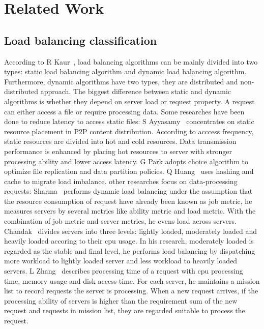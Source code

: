 \section{Related Work}
\label{sec:related_work}

\subsection{Load balancing classification}

\hspace{0pt}
According to R Kaur~{\cite{Kaur2014Load}}, load balancing algorithms can be mainly divided into two types: static load balancing algorithm and dynamic load balancing algorithm. Furthermore, dynamic algorithms have two types,
they are distributed and non-distributed approach. The biggest difference between static and dynamic algorithms is whether they depend on server load or request property. A request can either access a file or require processing data. Some researches have been done to reduce latency to access static files:
S Ayyasamy~{\cite{Ayyasamy2010A}} concentrates on static resource placement in P2P content distribution. According to acccess frequency, static resources are divided into hot and cold resources. Data transmission performance is enhanced by placing hot resources to server with
stronger processing ability and lower access latency. G Park adopts choice algorithm to optimize file replication and data partition policies. Q Huang~{\cite{Huang2014Characterizing}} uses hashing and cache to migrate load imbalance. other researches focus on data-processing requests: Sharma~{\cite{Sharma2011Framework}} performs dynamic load balancing
under the assumption that the resource consumption of request have already been known as job metric, he measures servers by several metrics like ability metric and load metric. With the combination of job metric and server metrics,
he evens load across servers. Chandak~{\cite{Chandak2012Dynamic}} divides servers into three levels: lightly loaded, moderately loaded and heavily loaded accoring to their cpu usage. In his research, moderately loaded is regarded as the stable and final
level, he performs load balancing by dispatching more workload to lightly loaded server and less workload to heavily loaded servers. L Zhang~{\cite{Zhang2010A}} describes processing time of a request with cpu processing time, memory usage and disk access time. For each server,
he maintains a mission list to record requests the server is processing. When a new request arrives, if the processing ability of servers is higher than the requirement sum of the new request and requests in mission list, they are regarded suitable to process the request.
